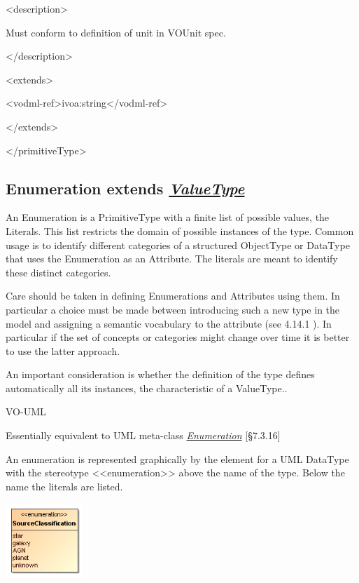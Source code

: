 \documentclass[10pt,a4paper]{ivoa}
\begin{document}
\textless description\textgreater{}

Must conform to definition of unit in VOUnit spec.

\textless/description\textgreater{}

\textless extends\textgreater{}

\textless vodml-ref\textgreater ivoa:string\textless/vodml-ref\textgreater{}

\textless/extends\textgreater{}

\textless/primitiveType\textgreater{}

\hypertarget{enumeration-extends-valuetype}{%
\subsection{\texorpdfstring{Enumeration extends
\protect\hyperlink{valuetype-extends-type}{\emph{ValueType}}}{Enumeration extends ValueType}}\label{enumeration-extends-valuetype}}

An Enumeration is a PrimitiveType with a finite list of possible values,
the Literals. This list restricts the domain of possible instances of
the type. Common usage is to identify different categories of a
structured ObjectType or DataType that uses the Enumeration as an
Attribute. The literals are meant to identify these distinct categories.

Care should be taken in defining Enumerations and Attributes using them.
In particular a choice must be made between introducing such a new type
in the model and assigning a semantic vocabulary to the attribute (see
4.14.1 ). In particular if the set of concepts or categories might
change over time it is better to use the latter approach.

An important consideration is whether the definition of the type defines
automatically all its instances, the characteristic of a ValueType..

\protect\hypertarget{_Literal}{}{}VO-UML

Essentially equivalent to UML meta-class
\href{http://www.uml-diagrams.org/class-diagrams.html\#enumeration}{\emph{Enumeration}}
{[}§7.3.16{]}

An enumeration is represented graphically by the element for a UML
DataType with the stereotype
\textless\textless enumeration\textgreater\textgreater{} above the name
of the type. Below the name the literals are listed.

\includegraphics[width=1.15833in,height=1.1in]{./media/image14.png}
\end{document}

